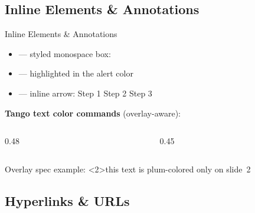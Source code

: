 \documentclass[presentation, aspectratio=169]{beamer}
\begin{document}
\subsection{Inline Elements \& Annotations}

\begin{frame}{Inline Elements \& Annotations}
  \begin{itemize}
    \item {} --- styled monospace box: 
    \item {} --- \alert{highlighted in the alert color}
    \item \inlinecode{\\beamerarrow\{\}} --- inline arrow: Step 1 \beamerarrow{} Step 2 \beamerarrow{} Step 3
  \end{itemize}

  \vspace{0.4em}
  \textbf{Tango text color commands} (overlay-aware): 

  \vspace{0.3em}
  \begin{columns}
    \begin{column}{0.48\columnwidth}
       \quad
      \\[0.3em]
       \quad
    \end{column}
    \begin{column}{0.45\columnwidth}
       \quad
      \\[0.3em]
       \quad
    \end{column}
  \end{columns}

  \vspace{0.3em}
  Overlay spec example: <2>{this text is plum-colored only on slide~2}
\end{frame}

\subsection{Hyperlinks \& URLs}
\end{document}
